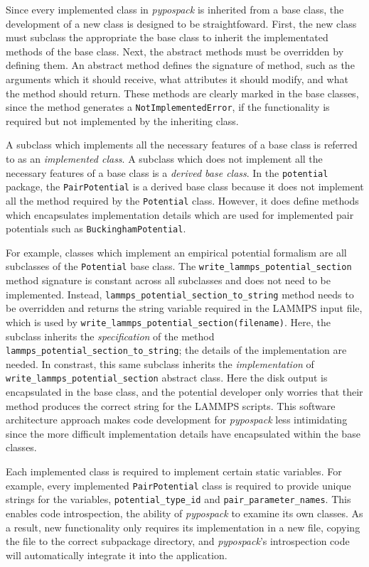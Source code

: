Since every implemented class in \emph{pypospack} is inherited from a base class, the development of a new class is designed to be straightfoward.  First, the new class must subclass the appropriate the base class to inherit the implementated methods of the base class.  Next, the abstract methods must be overridden by defining them.   An abstract method defines the signature of method, such as the arguments which it should receive, what attributes it should modify, and what the method should return.  These methods are clearly marked in the base classes, since the method generates a \verb|NotImplementedError|, if the functionality is required but not implemented by the inheriting class.

A subclass which implements all the necessary features of a base class is referred to as an \emph{implemented class}.  A subclass which does not implement all the necessary features of a base class is a \emph{derived base class}.  In the \verb|potential| package, the \verb|PairPotential| is a derived base class because  it does not implement all the method required by the \verb|Potential| class.  However, it does define methods which encapsulates implementation details which are used for implemented pair potentials such as \verb|BuckinghamPotential|.

For example, classes which implement an empirical potential formalism are all subclasses of the \verb|Potential| base class.  The \verb|write_lammps_potential_section| method signature is constant across all subclasses and does not need to be implemented.
Instead, \verb|lammps_potential_section_to_string| method needs to be overridden and returns the string variable required in the LAMMPS input file, which is used by \verb|write_lammps_potential_section(filename)|.
Here, the subclass inherits the \emph{specification} of the method \verb|lammps_potential_section_to_string|; the details of the implementation are needed.  In constrast, this same subclass inherits the \emph{implementation}  of \verb|write_lammps_potential_section| abstract class.
Here the disk output is encapsulated in the base class, and the potential developer only worries that their method produces the correct string for the LAMMPS scripts.
This software architecture approach makes code development for \emph{pypospack} less intimidating since the more difficult implementation details have encapsulated within the base classes.

Each implemented class is required to implement certain static variables.  For example, every implemented \verb|PairPotential| class is required to provide unique strings for the variables, \verb|potential_type_id| and \verb|pair_parameter_names|.  This enables code introspection, the ability of \emph{pypospack} to examine its own classes.  As a result, new functionality only requires its implementation in a new file, copying the file to the correct subpackage directory, and \emph{pypospack}'s introspection code will automatically integrate it into the application.

